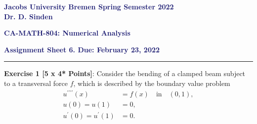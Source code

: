 \documentclass{article}
\begin{document}
\noindent\textsf{\textbf{\textcolor{MidnightBlue}{Jacobs University Bremen \hfill Spring Semester 2022}}}\\

\noindent{}\textsf{\textbf{\textcolor{MidnightBlue}{Dr. D. Sinden}}}\\

\begin{center}
{\Large \textbf{\textsf{\textcolor{MidnightBlue}{CA-MATH-804: Numerical Analysis}}}}
\end{center}

\begin{flushright}
\textbf{\textsf{\textcolor{MidnightBlue}{Assignment Sheet 6. Due: February 23, 2022}}}
\end{flushright}

\begin{center}
\textcolor{MidnightBlue}{\rule[0.5\baselineskip]{1.0cm}{0.4pt}}
\end{center}

\noindent\textsf{\textbf{Exercise 1 [5 x 4* Points]}}: Consider the bending of a clamped beam subject to a transversal force
$f$, which is described by the boundary value problem
\begin{align*}
u^{\prime\prime\prime\prime}\left(x\right) & = f\left(x\right) \quad \mbox{in} \quad(0,1), \\
u(0) = u(1) & = 0, \\
u^{\prime}(0) = u^{\prime}(1) & = 0. 
\end{align*}
\end{document}

